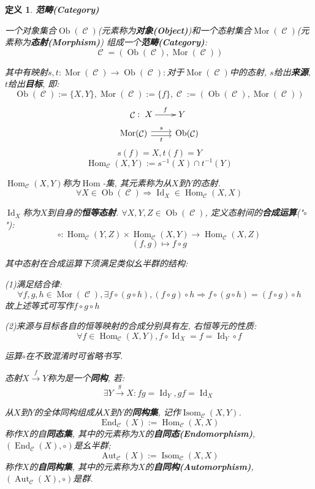 \documentclass[UTF8]{ctexart}
\newcommand{\<}{\langle}
\renewcommand{\>}{\rangle}
\DeclareMathOperator{\Id}{Id}
\DeclareMathOperator{\MC}{\mathcal{C}}
\DeclareMathOperator{\Ob}{Ob}
\DeclareMathOperator{\Mor}{Mor}
\DeclareMathOperator{\Hom}{Hom}
\DeclareMathOperator{\End}{End}
\DeclareMathOperator{\Aut}{Aut}
\DeclareMathOperator{\Isom}{Isom}
\newtheorem{dfn}[thm]{定义}
\begin{document}
            \begin{dfn}
                \textbf{范畴(Category)}
        
                一个对象集合$\Ob(\MC)$(元素称为\textbf{对象(Object)})和一个态射集合$\Mor(\MC)$(元素称为\textbf{态射(Morphism)}) 组成一个\textbf{范畴(Category)}: 
                \[\MC=(\Ob(\MC),\Mor(\MC))\]
        
                其中有映射$s,t:\Mor(\MC)\to\Ob(\MC): $对于$\Mor(\MC)$中的态射, $s$给出\textbf{来源}, $t$给出\textbf{目标}, 即: 
                \[\Ob(\MC):=\{X,Y\}, \Mor(\MC):=\{f\}, \MC:=(\Ob(\MC),\Mor(\MC))\]
                \[\MC: \xymatrix{
                    X\ar[r]^f & Y
                }\]
                \[\begin{tikzcd}
                    \Mor(\MC) \arrow[r, "s", shift left] \arrow[r, "t"', shift right] & \Ob(\MC)
                \end{tikzcd}\]
                \[s(f)=X, t(f)=Y\]
                \[\Hom_{\MC}(X,Y):=s^{-1}(X)\cap t^{-1}(Y)\]
                
                $\Hom_{\MC}(X,Y)$称为$\Hom$-集, 其元素称为从$X$到$Y$的态射. 
                \[\forall X\in \Ob(\MC)\Longrightarrow\Id_X\in\Hom_{\MC}(X,X)\]
                
                $\Id_X$称为$X$到自身的\textbf{恒等态射}. 
                $\forall X,Y,Z\in\Ob(\MC)$, 定义态射间的\textbf{合成运算}("$\circ$"): 
                \[\circ: \Hom_{\MC}(Y,Z)\times\Hom_{\MC}(X,Y)\to\Hom_{\MC}(X,Z)\]
                \[(f,g)\mapsto f\circ g\]
                
                其中态射在合成运算下须满足类似幺半群的结构: 
                
                (1)满足结合律: \[\forall f,g,h\in\Mor(\MC), \exists f\circ(g\circ h), (f\circ g)\circ h\Longrightarrow f\circ(g\circ h)=(f\circ g)\circ h\]
                故上述等式可写作$f\circ g\circ h$
        
                (2)来源与目标各自的恒等映射的合成分别具有左, 右恒等元的性质: 
                \[\forall f\in\Hom_{\MC}(X,Y), f\circ\Id_X=f=\Id_Y\circ f\]
        
                运算$\circ$在不致混淆时可省略书写. 
        
                态射$X\overset{f}{\longrightarrow}Y$称为是一个\textbf{同构}, 若: 
                \[\exists Y\overset{g}{\longrightarrow}X: fg=\Id_Y, gf=\Id_X\]
                
                从$X$到$Y$的全体同构组成从$X$到$Y$的\textbf{同构集}, 记作$\Isom_{\MC}(X,Y)$. 
                \[\End_{\MC}(X):=\Hom_{\MC}(X,X)\]
                称作$X$的自\textbf{同态集}, 其中的元素称为$X$的\textbf{自同态(Endomorphism)}, $(\End_{\MC}(X),\circ)$是幺半群; 
                \[\Aut_{\MC}(X):=\Isom_{\MC}(X,X)\]
                称作$X$的\textbf{自同构集}, 其中的元素称为$X$的\textbf{自同构(Automorphism)}, $(\Aut_{\MC}(X),\circ)$是群. 
            \end{dfn}
            
\end{document}
